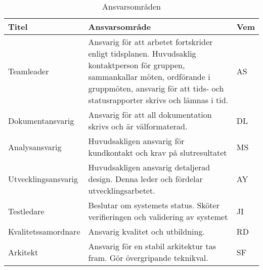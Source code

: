 \begin{table}[h]
  \centering
    \begin{tabularx}{\textwidth}{| l | X | l |}
      \hline
      \textbf{Titel} & \textbf{Ansvarsområde} & \textbf{Vem} \\
      \hline
      {Teamleader} & {Ansvarig för att arbetet fortskrider enligt tidsplanen. Huvudsaklig kontaktperson för gruppen, sammankallar möten, ordförande i gruppmöten, ansvarig för att tids- och statusrapporter skrivs och lämnas i tid.} & {AS} \\\hline
      
      {Dokumentansvarig} & {Ansvarig för att all dokumentation skrivs och är välformaterad.} & {DL} \\\hline
      
      {Analysansvarig} & {Huvudsakligen ansvarig för kundkontakt och krav på slutresultatet} & {MS} \\\hline
      
      {Utvecklingsansvarig} & {Huvudsakligen ansvarig detaljerad design. Denna leder och fördelar utvecklingsarbetet. } & {AY} \\\hline
      
      {Testledare} & {Beslutar om systemets status. Sköter verifieringen och validering av systemet} & {JI} \\\hline
      
      {Kvalitetssamordnare} & {Ansvarig kvalitet och utbildning.} & {RD} \\\hline
      
        {Arkitekt} & {Ansvarig för en stabil arkitektur tas fram. Gör övergripande teknikval. } & {SF} \\\hline
    \end{tabularx}
  \caption{Ansvarsområden} \label{projektplan:ansvarsomraden}
\end{table}
